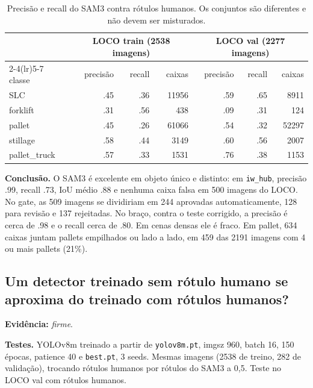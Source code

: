 \documentclass[11pt,a4paper]{article}
\newcommand{\evidencia}[1]{\noindent\textbf{Evidência:} \emph{#1}.\par}
\newcommand{\testes}{\noindent\textbf{Testes.} }
\newcommand{\conclusao}{\noindent\textbf{Conclusão.} }
\begin{document}
\begin{table}[H]
\centering\small
\caption{Precisão e recall do SAM3 contra rótulos humanos. Os conjuntos são
diferentes e não devem ser misturados.}
\label{tab:sam3q}
\begin{tabular}{lrrrrrr}
\toprule
& \multicolumn{3}{c}{LOCO train (2538 imagens)} & \multicolumn{3}{c}{LOCO val (2277 imagens)} \\
\cmidrule(lr){2-4}\cmidrule(lr){5-7}
classe & precisão & recall & caixas & precisão & recall & caixas \\
\midrule
SLC & .45 & .36 & 11956 & .59 & .65 & 8911 \\
forklift & .31 & .56 & 438 & .09 & .31 & 124 \\
pallet & .45 & .26 & 61066 & .54 & .32 & 52297 \\
stillage & .58 & .44 & 3149 & .60 & .56 & 2007 \\
pallet\_truck & .57 & .33 & 1531 & .76 & .38 & 1153 \\
\bottomrule
\end{tabular}
\end{table}

\conclusao O SAM3 é excelente em objeto único e distinto: em \texttt{iw\_hub},
precisão .99, recall .73, IoU médio .88 e nenhuma caixa falsa em 500 imagens do
LOCO. No gate, as 509 imagens se dividiriam em 244 aprovadas automaticamente,
128 para revisão e 137 rejeitadas. No braço, contra o teste corrigido, a
precisão é cerca de .98 e o recall cerca de .80. Em cenas densas ele é fraco. Em
pallet, 634 caixas juntam pallets empilhados ou lado a lado, em 459 das 2191
imagens com 4 ou mais pallets (21\%).

\subsection{Um detector treinado sem rótulo humano se aproxima do treinado com rótulos humanos?}
\evidencia{firme}

\testes YOLOv8m treinado a partir de \texttt{yolov8m.pt}, imgsz 960, batch 16,
150 épocas, patience 40 e \texttt{best.pt}, 3 seeds. Mesmas imagens (2538 de
treino, 282 de validação), trocando rótulos humanos por rótulos do SAM3 a 0,5.
Teste no LOCO val com rótulos humanos.
\end{document}
